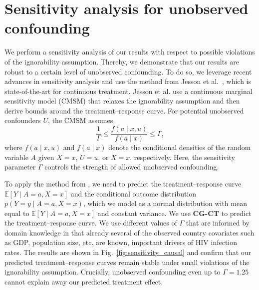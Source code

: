 \documentclass[sigconf]{acmart}
\newcommand{\framework}{\textbf{\mbox{CG-CT}}\xspace}
\begin{document}
\newpage 

\section{Sensitivity analysis for unobserved confounding}
\label{supp:causal_sensitivity} %

We perform a sensitivity analysis of our results with respect to possible violations of the ignorability assumption. Thereby, we demonstrate that our results are robust to a certain level of unobserved confounding. To do so, we leverage recent advances in sensitivity analysis and use the method from Jesson et al.~\cite{Jesson.2022}, which is state-of-the-art for continuous treatment. Jesson et al. use a continuous marginal sensitivity model (CMSM) that relaxes the ignorability assumption and then derive bounds around the treatment--response curve. For potential unobserved confounders $U$, the CMSM \cite{Jesson.2022} assumes
\begin{equation}\label{eq:ratio_bound_cmsm}
\frac{1}{\Gamma} \leq \frac{f(a \mid x, u)}{f(a \mid x)}  \leq \Gamma,
\end{equation}
where $f(a \mid x, u)$ and $f(a \mid x)$ denote the conditional densities of the random variable $A$ given $X=x$, $U=u$, or $X=x$, respectively. Here, the sensitivity parameter $\Gamma$ controls the strength of allowed unobserved confounding. 

To apply the method from \cite{Jesson.2022}, we need to predict the treatment--response curve $\mathbb{E}[Y \mid A = a, X = x]$ and the conditional outcome distribution $p(Y = y \mid A = a, X = x)$, which we model as a normal distribution with mean equal to $\mathbb{E}[Y \mid A = a, X = x]$ and constant variance. We use \framework to predict the treatment--response curve. We use different values of $\Gamma$ that are informed by domain knowledge in that already several of the observed country covariates such as GDP, population size, etc. are known, important drivers of HIV infection rates. The results are shown in Fig.~\ref{fig:sensitivity_causal} and confirm that our predicted treatment--response curves remain stable under small violations of the ignorability assumption. Crucially, unobserved confounding even up to $\Gamma = 1.25$ cannot explain away our predicted treatment effect. 
\end{document}
